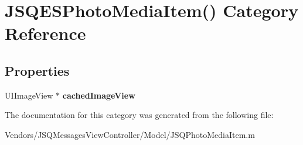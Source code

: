 \hypertarget{category_j_s_q_e_s_photo_media_item_07_08}{}\section{J\+S\+Q\+E\+S\+Photo\+Media\+Item() Category Reference}
\label{category_j_s_q_e_s_photo_media_item_07_08}
\subsection*{Properties}
\begin{DoxyCompactItemize}
\item 
\hypertarget{category_j_s_q_e_s_photo_media_item_07_08_a675ce6eb2209a5788f13f5156a1c922b}{}U\+I\+Image\+View $\ast$ {\bfseries cached\+Image\+View}\label{category_j_s_q_e_s_photo_media_item_07_08_a675ce6eb2209a5788f13f5156a1c922b}

\end{DoxyCompactItemize}


The documentation for this category was generated from the following file\+:\begin{DoxyCompactItemize}
\item 
Vendors/\+J\+S\+Q\+Messages\+View\+Controller/\+Model/J\+S\+Q\+Photo\+Media\+Item.\+m\end{DoxyCompactItemize}
